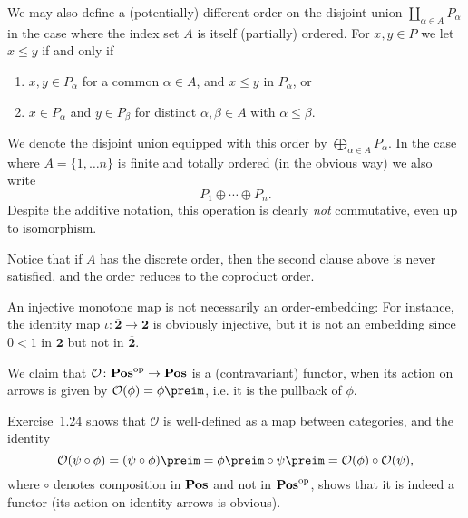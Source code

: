 \documentclass[article, a4paper, 11pt, oneside]{memoir}
\numberwithin{equation}{chapter}
\newcommand{\RNum}[1]{\uppercase\expandafter{\romannumeral #1\relax}}
\newcommand{\exref}[1]{%
    \hyperref[ex:#1]{Exercise~#1}%
}
\theoremstyle{nonumberplain}
\let\bigcoprod\coprod
\renewcommand{\coprod}{\sqcup}
\begin{document}
\begin{remarkbreak}
    We may also define a (potentially) different order on the disjoint union $\bigcoprod_{\alpha \in A} P_\alpha$ in the case where the index set $A$ is itself (partially) ordered. For $x,y \in P$ we let $x \leq y$ if and only if
    \begin{enumerate}
        \item $x,y \in P_\alpha$ for a common $\alpha \in A$, and $x \leq y$ in $P_\alpha$, or
        \item $x \in P_\alpha$ and $y \in P_\beta$ for distinct $\alpha,\beta \in A$ with $\alpha \leq \beta$.
    \end{enumerate}
    We denote the disjoint union equipped with this order by $\bigoplus_{\alpha \in A} P_\alpha$. In the case where $A = \{1, \ldots n\}$ is finite and totally ordered (in the obvious way) we also write
    \begin{equation*}
        P_1 \oplus \cdots \oplus P_n.
    \end{equation*}
    Despite the additive notation, this operation is clearly \emph{not} commutative, even up to isomorphism.

    Notice that if $A$ has the discrete order, then the second clause above is never satisfied, and the order reduces to the coproduct order.
\end{remarkbreak}


\begin{remark}
    An injective monotone map is not necessarily an order-embedding: For instance, the identity map $\iota \colon \overline{\mathbf{2}} \to \mathbf{2}$ is obviously injective, but it is not an embedding since $0 < 1$ in $\mathbf{2}$ but not in $\overline{\mathbf{2}}$.
\end{remark}

\newcommand{\downsets}{\mathcal{O}}
\newcommand{\op}{^{\mathrm{op}}}

\begin{remarkbreak}[The functor $\downsets$]
    We claim that $\mathcal{O} \colon \catPos\op \to \catPos$ is a (contravariant) functor, when its action on arrows is given by $\mathcal{O}(\phi) = \phi\preim$, i.e. it is the pullback of $\phi$.

    \exref{1.24} shows that $\mathcal{O}$ is well-defined as a map between categories, and the identity
    \begin{equation*}
        \mathcal{O}(\psi \circ \phi)
            = (\psi \circ \phi)\preim
            = \phi\preim \circ \psi\preim
            = \mathcal{O}(\phi) \circ \mathcal{O}(\psi),
    \end{equation*}
    where $\circ$ denotes composition in $\mathbf{Pos}$ and not in $\catPos\op$, shows that it is indeed a functor (its action on identity arrows is obvious).
\end{remarkbreak}
\end{document}
